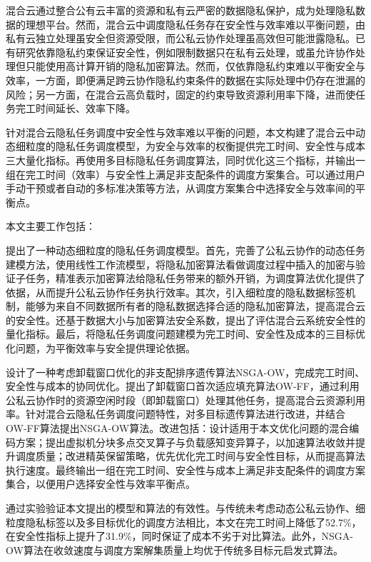 混合云通过整合公有云丰富的资源和私有云严密的数据隐私保护，成为处理隐私数据的理想平台。然而，混合云中调度隐私任务存在安全性与效率难以平衡问题，由私有云独立处理虽安全但资源受限，而公私云协作处理虽高效但可能泄露隐私。已有研究依靠隐私约束保证安全性，例如限制数据只在私有云处理，或虽允许协作处理但只能使用高计算开销的隐私加密算法。然而，仅依靠隐私约束难以平衡安全与效率，一方面，即便满足跨云协作隐私约束条件的数据在实际处理中仍存在泄漏的风险；另一方面，在混合云高负载时，固定的约束导致资源利用率下降，进而使任务完工时间延长、效率下降。

针对混合云隐私任务调度中安全性与效率难以平衡的问题，本文构建了混合云中动态细粒度的隐私任务调度模型，为安全与效率的权衡提供完工时间、安全性与成本三大量化指标。再使用多目标隐私任务调度算法，同时优化这三个指标，并输出一组在完工时间（效率）与安全性上满足非支配条件的调度方案集合。可以通过用户手动干预或者自动的多标准决策等方法，从调度方案集合中选择安全与效率间的平衡点。

本文主要工作包括：

提出了一种动态细粒度的隐私任务调度模型。首先，完善了公私云协作的动态任务建模方法，使用线性工作流模型，将隐私加密算法看做调度过程中插入的加密与验证子任务，精准表示加密算法给隐私任务带来的额外开销，为调度算法优化提供了依据，从而提升公私云协作任务执行效率。其次，引入细粒度的隐私数据标签机制，能够为来自不同数据所有者的隐私数据选择合适的隐私加密算法，提高混合云的安全性。还基于数据大小与加密算法安全系数，提出了评估混合云系统安全性的量化指标。最后，将隐私任务调度问题建模为完工时间、安全性及成本的三目标优化问题，为平衡效率与安全提供理论依据。

设计了一种考虑卸载窗口优化的非支配排序遗传算法NSGA-OW，完成完工时间、安全性与成本的协同优化。提出了卸载窗口首次适应填充算法OW-FF，通过利用公私云协作时的资源空闲时段（即卸载窗口）处理其他任务，提高混合云资源利用率。针对混合云隐私任务调度问题特性，对多目标遗传算法进行改进，并结合OW-FF算法提出NSGA-OW算法。改进包括：设计适用于本文优化问题的混合编码方案；提出虚拟机分块多点交叉算子与负载感知变异算子，以加速算法收敛并提升调度质量；改进精英保留策略，优先优化完工时间与安全性目标，从而提高算法执行速度。最终输出一组在完工时间、安全性与成本上满足非支配条件的调度方案集合，以便用户选择安全性与效率平衡点。

通过实验验证本文提出的模型和算法的有效性。与传统未考虑动态公私云协作、细粒度隐私标签以及多目标优化的调度方法相比，本文在完工时间上降低了52.7\%，在安全性指标上提升了31.9\%，同时保证了成本不劣于对比算法。此外，NSGA-OW算法在收敛速度与调度方案解集质量上均优于传统多目标元启发式算法。

